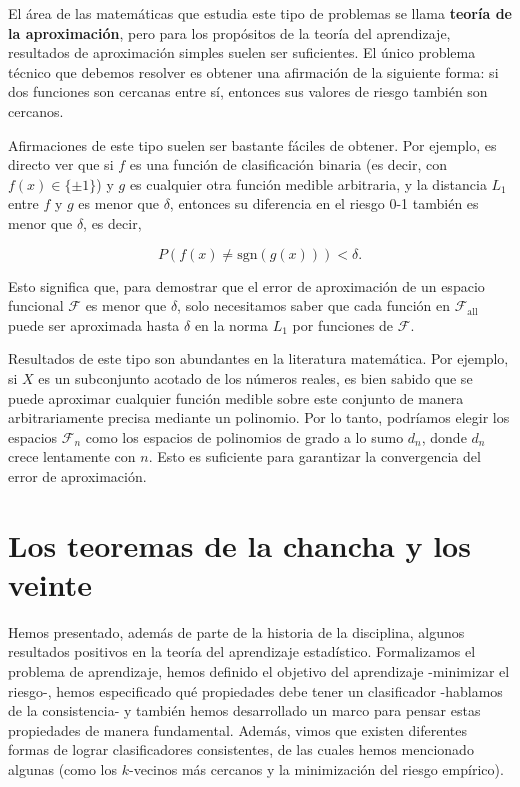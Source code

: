 \documentclass{article}
\begin{document}
El área de las matemáticas que estudia este tipo de problemas se llama \textbf{teoría de la aproximación}, 
pero para los propósitos de la teoría del aprendizaje, resultados de aproximación simples suelen ser 
suficientes. El único 
problema técnico que debemos resolver es obtener una afirmación de la siguiente forma: si dos funciones 
son cercanas entre sí, entonces sus valores de riesgo también son cercanos.

Afirmaciones de este tipo suelen ser bastante fáciles de obtener. Por ejemplo, es directo ver que si 
\(f\) es una función de clasificación binaria (es decir, con \(f(x) \in \{\pm1\}\)) y \(g\) es cualquier 
otra función medible arbitraria, y la distancia \(L_1\) entre \(f\) y \(g\) es menor que \(\delta\), 
entonces su diferencia en el riesgo 0-1 también es menor que \(\delta\), es decir,

\[
P(f(x) \neq \text{sgn}(g(x))) < \delta.
\]

Esto significa que, para demostrar que el error de aproximación de un espacio funcional \(\mathcal{F}\) 
es menor que \(\delta\), solo necesitamos saber que cada función en \(\mathcal{F}_{\text{all}}\) puede 
ser aproximada hasta \(\delta\) en la norma \(L_1\) por funciones de \(\mathcal{F}\).\newline

Resultados de este tipo son abundantes en la literatura matemática. Por ejemplo, si \(X\) es un subconjunto 
acotado de los números reales, es bien sabido que se puede aproximar cualquier función medible sobre este 
conjunto de manera arbitrariamente precisa mediante un polinomio. Por lo tanto, podríamos elegir los espacios 
\(\mathcal{F}_n\) como los espacios de polinomios de grado a lo sumo \(d_n\), donde \(d_n\) crece lentamente 
con \(n\). Esto es suficiente para garantizar la convergencia del error de aproximación.\newline

\section{Los teoremas de la chancha y los veinte}

Hemos presentado, además de parte de la historia de la disciplina, algunos resultados positivos en la teoría del aprendizaje estadístico. 
Formalizamos el problema de aprendizaje, hemos definido el objetivo del aprendizaje -minimizar el 
riesgo-, hemos especificado qué propiedades debe tener un clasificador -hablamos de la consistencia- y también hemos desarrollado un 
marco para pensar estas propiedades de manera fundamental. Además, vimos que existen 
diferentes formas de lograr clasificadores consistentes, de las cuales hemos mencionado algunas (como los \(k\)-vecinos más cercanos y la 
minimización del riesgo empírico).\newline
\end{document}
